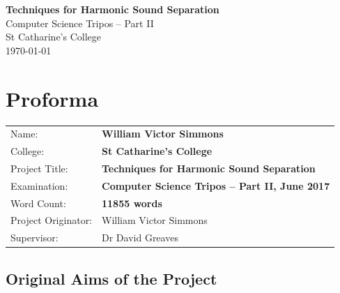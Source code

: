 \documentclass[12pt,a4paper,twoside,openright]{report}
\begin{document}


\pagestyle{empty}
\vspace*{60mm}
\begin{center}
\Huge
\textbf{Techniques for Harmonic Sound Separation} \\[5mm]
Computer Science Tripos -- Part II \\[5mm]
St Catharine's College \\[5mm]
\today %
\end{center}



\chapter*{Proforma}

\pagestyle{plain}








{\large
\begin{tabular}{ll}
Name: & \bf William Victor Simmons \\
College: & \bf St Catharine's College \\
Project Title: & \bf Techniques for Harmonic Sound Separation \\
Examination: & \bf Computer Science Tripos -- Part II, June 2017 \\
Word Count: & \bf 11855 words \\ %
Project Originator: & William Victor Simmons \\
Supervisor: & Dr David Greaves \\
\end{tabular}
}

\section*{Original Aims of the Project}
\end{document}
